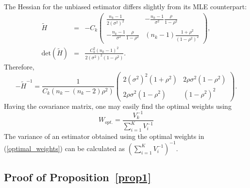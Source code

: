 \documentclass[11pt,a5paper,twoside]{book}
\begin{document}
{\begin{equation}
\end{equation}
The Hessian for the unbiased estimator differs slightly from its MLE counterpart:
\begin{eqnarray}
\label{tilde_H}
\tilde{H}&=& -C_k \begin{pmatrix}
\frac{n_k-1}{2(\sigma^2)^2} & -\frac{n_k-1}{\sigma^2} \frac{\rho}{1-\rho^2}\\
-\frac{n_k-1}{\sigma^2} \frac{\rho}{1-\rho^2} & (n_k-1)\frac{1+\rho^2}{(1-\rho^2)^2}
\end{pmatrix},\\
\label{det_tilde_H}
\mathrm{det}(\tilde{H})&=&\frac{C_k^2 (n_k-1)^2}{2(\sigma^2)^2 (1-\rho^2)}.
\end{eqnarray}
Therefore,
\begin{equation}
\label{covariance_unbiased}
-\tilde{H}^{-1}=\frac{1}{C_k(n_k-(n_k-2)\rho^2)} \begin{pmatrix}
2(\sigma^2)^2 (1+\rho^2) & 2\rho \sigma^2 (1-\rho^2)\\
2\rho \sigma^2 (1-\rho^2) &  (1-\rho^2)^2
\end{pmatrix}.
\end{equation}
Having the covariance matrix, one may easily find the optimal weights using
\begin{equation}
\label{optimal_weights}
W_{opt.}=\frac{V^{-1}_k}{\sum_{i=1}^{K} V^{-1}_i}
\end{equation}
The variance of an estimator obtained using the optimal weights in (\ref{optimal_weights}) can be calculated as $\left(\sum_{i=1}^{K} V^{-1}_i\right)^{-1}$.

\subsection{Proof of Proposition~\ref{prop1}\label{suppproof}}

\newcommand{\mua}{\widetilde{\mu}_\alpha}

}
\end{document}
